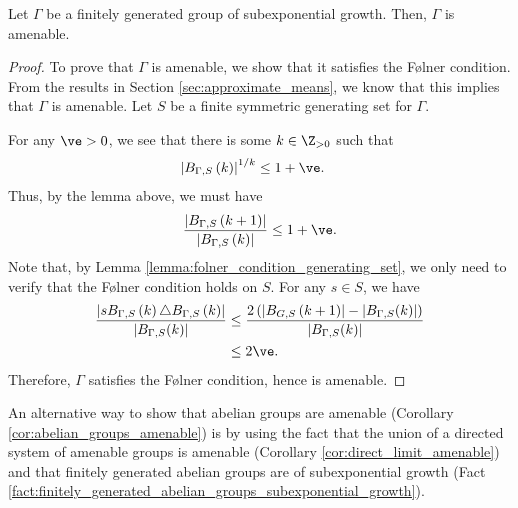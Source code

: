 \begin{theorem}\label{thm:subexponential_growth_implies_amenable}
  Let $\Gamma$ be a finitely generated group of subexponential growth. Then, $\Gamma$ is amenable.
\end{theorem}
\begin{proof}
  To prove that $\Gamma$ is amenable, we show that it satisfies the Følner condition. From the results in Section \ref{sec:approximate_means}, we know that this implies that $\Gamma$ is amenable. Let $S$ be a finite symmetric generating set for $\Gamma$.\newline

  For any $\ve > 0$, we see that there is some $k\in \N$ such that
  \begin{align*}
    \left\vert B_{\Gamma,S}\left(k\right) \right\vert^{1/k} &\leq 1 + \ve.
  \end{align*}
  Thus, by the lemma above, we must have
  \begin{align*}
    \frac{\left\vert B_{\Gamma,S}\left(k+1\right) \right\vert}{\left\vert B_{\Gamma,S} \left(k\right)\right\vert} \leq 1 + \ve.
  \end{align*}
  Note that, by Lemma \ref{lemma:folner_condition_generating_set}, we only need to verify that the Følner condition holds on $S$. For any $s\in S$, we have
  \begin{align*}
    \frac{\left\vert sB_{\Gamma,S}\left(k\right)\triangle B_{\Gamma,S}\left(k\right) \right\vert}{\left\vert B_{\Gamma,S}(k) \right\vert} &\leq \frac{2\left(\left\vert B_{G,S}\left(k+1\right) \right\vert - \left\vert B_{\Gamma,S}(k) \right\vert\right)}{\left\vert B_{\Gamma,S}(k) \right\vert}\\
                                                                                                                    &\leq 2\ve.
  \end{align*}
  Therefore, $\Gamma$ satisfies the Følner condition, hence is amenable.
\end{proof}
\begin{remark}
  An alternative way to show that abelian groups are amenable (Corollary \ref{cor:abelian_groups_amenable}) is by using the fact that the union of a directed system of amenable groups is amenable (Corollary \ref{cor:direct_limit_amenable}) and that finitely generated abelian groups are of subexponential growth (Fact \ref{fact:finitely_generated_abelian_groups_subexponential_growth}).
\end{remark}
